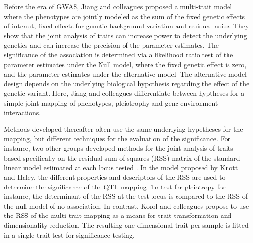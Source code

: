 Before the era of GWAS, Jiang and colleagues \parencite*{Jiang1995} proposed a multi-trait model where the phenotypes are jointly modeled as the sum of the fixed genetic effects of interest, fixed effects for genetic background variation and residual noise. They show that the joint analysis of traits can increase power to detect the underlying genetics and can increase the precision of the parameter estimates. The significance of the association is determined via a likelihood ratio test of the parameter estimates under the Null model, where the fixed genetic effect is zero, and the parameter estimates under the alternative model. The alternative model design depends on the underlying biological hypothesis regarding the effect of the genetic variant. Here, Jiang and colleagues differentiate between hyptheses for a simple joint mapping of phenotypes, pleiotrophy and gene-environment interactions.%

Methods developed thereafter often use the same underlying hypotheses for the mapping, but different techniques for the evaluation of the significance. For instance, two other groups developed methods for the joint analysis of traits based specifically on the residual sum of squares (RSS) matrix of the standard linear model estimated at each locus tested \citep{Knott2000,Korol2001}. In the model proposed by Knott and Haley, the different properties and descriptors of the RSS are used to determine the significance of the QTL mapping. To test for pleiotropy for instance, the determinant of the RSS at the test locus is compared to the RSS of the null model of no association. In contrast, Korol and colleagues propose to use the RSS of the multi-trait mapping as a means for trait transformation and dimensionality reduction. The resulting one-dimensional trait per sample is fitted in a single-trait test for significance testing.  

